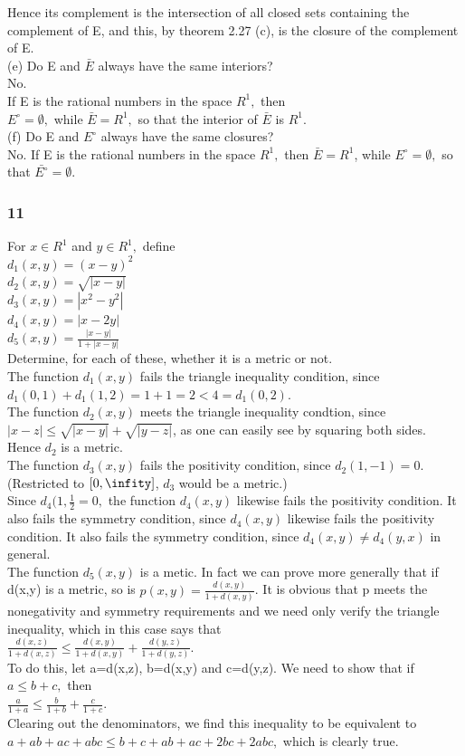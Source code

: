 Hence its complement is the intersection of all closed sets containing the complement of E, and this, by theorem 2.27 (c), is the closure of the complement of E. \\ 
(e) Do E and $\bar{E}$ always have the same interiors? \\ 
No. \\ 
If E is the rational numbers in the space $R^{1},$ then \\ 
$E^{\circ}=\emptyset,$ while $\bar{E}=R^1,$ so that the interior of $\bar{E}$ is $R^1.$ \\ 
(f) Do E and $E^{\circ}$ always have the same closures? \\ 
No. If E is the rational numbers in the space $R^{1},$ then $\bar{E}=R^{1}$, while $E^{\circ}=\emptyset,$ so that $\bar{E^{\circ}}=\emptyset.$\\ 
\subsubsection*{11}
For $x \in R^1$ and $y \in R^1,$ define \\ 
$d_1(x,y)=(x-y)^2$ \\ 
$d_2(x,y)=\sqrt{|x-y|}$\\ 
$d_3(x,y)=|x^2-y^2|$\\ 
$d_4(x,y)=|x-2y|$ \\ 
$d_5(x,y)= \frac{|x-y|}{1+|x-y|}$\\ 
Determine, for each of these, whether it is a metric or not. \\
The function $d_{1}(x,y)$ fails the triangle inequality condition, since $d_{1}(0,1)+d_{1}(1,2)=1+1=2<4=d_{1}(0,2).$\\ 
The function $d_2(x,y)$ meets the triangle inequality condtion, since $|x-z|\leq \sqrt{|x-y|}+\sqrt{|y-z|}$, as one can easily see by squaring both sides. Hence $d_2$ is a metric. \\ 
The function $d_{3}(x,y)$ fails the positivity condition, since $d_{2}(1,-1)=0.$ \\
(Restricted to $[0, \infity]$, $d_{3}$ would be a metric.) \\ 
Since $d_{4}(1, \frac{1}{2}=0,$ the function $d_{4}(x,y)$ likewise fails the positivity condition. It also fails the symmetry condition, since $d_{4}(x,y)$ likewise fails the positivity condition. It also fails the symmetry condition, since $d_{4}(x,y) \neq d_{4}(y,x)$ in general. \\ 
The function $d_{5}(x,y)$ is a metic. 
In fact we can prove more generally that if d(x,y) is a metric, so is $p(x,y)= \frac{d(x,y)}{1+d(x,y)}$. It is obvious that p meets the nonegativity and symmetry requirements and we need only verify the triangle inequality, 
which in this case says that \\ 
$\frac{d(x,z)}{1+d(x,z)} \leq \frac{d(x,y)}{1+d(x,y)}+\frac{d(y,z)}{1+d(y,z)}.$\\ 
To do this, let a=d(x,z), b=d(x,y) and c=d(y,z). We need to show that if $a \leq b+c,$ then \\ 
$\frac{a}{1+a}\leq \frac{b}{1+b}+\frac{c}{1+c}.$\\ 
Clearing out the denominators, we find this inequality to be equivalent to $a+ab+ac+abc \leq b+c+ab+ac+2bc+2abc,$ which is clearly true. \\ 
